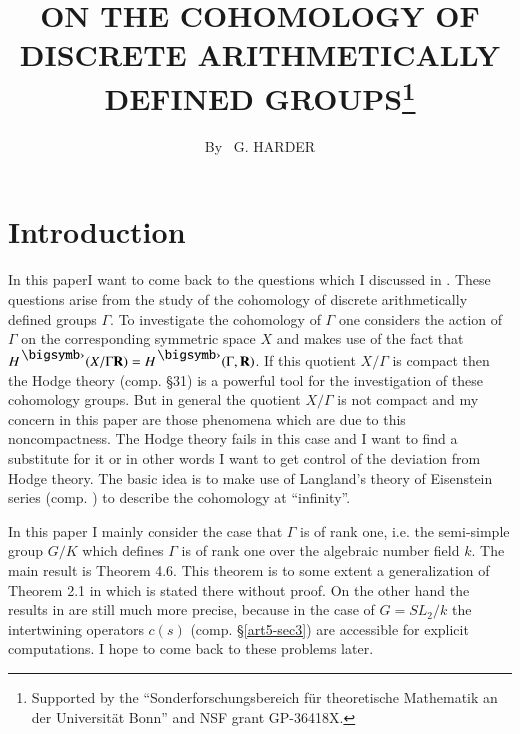 
\title{ON THE COHOMOLOGY OF DISCRETE ARITHMETICALLY DEFINED GROUPS\footnote{Supported by the ``Sonderforschungsbereich f\"ur theoretische Mathematik an der Universit\"at Bonn'' and NSF grant GP-36418X.}}

\author{By~ G. HARDER} 

\date{}
\maketitle


\setcounter{pageoriginal}{128}

\section*{Introduction}
In this paper\pageoriginale I want to come back to the questions which I discussed in \cite{art5-key7}. These questions arise from the study of the cohomology of discrete arithmetically defined groups $\Gamma$. To investigate the cohomology of $\Gamma$ one considers the action of $\Gamma$ on the corresponding symmetric space $X$ and makes use of the fact that $H^\bigdot (X / \Gamma \bR) = H^\bigdot (\Gamma, \bR)$. If this quotient $X / \Gamma$ is compact then the Hodge theory (comp. \cite{art5-key12} \S 31) is a powerful tool for the investigation of these cohomology groups. But in general the quotient $X/ \Gamma$ is not compact and my concern in this paper are those phenomena which are due to this noncompactness. The Hodge theory fails in this case and I want to find a substitute for it or in other words I want to get control of the deviation from Hodge theory. The basic idea is to make use of Langland's theory of Eisenstein series (comp. \cite{art5-key8}) to describe the cohomology at ``infinity''.

In this paper I mainly consider the case that $\Gamma$ is of rank one, i.e. the semi-simple group $G/ K$ which defines $\Gamma$ is of rank one over the algebraic number field $k$. The main result is Theorem 4.6. This theorem is to some extent a generalization of Theorem 2.1 in \cite{art5-key7} which is stated there without proof. On the other hand the results in \cite{art5-key7} are still much more precise, because in the case of $G = S L_2 / k$ the intertwining operators $c (s)$ (comp. \S \ref{art5-sec3}) are accessible for explicit computations. I hope to come back to these problems later.

